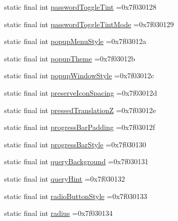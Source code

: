 \begin{DoxyCompactItemize}
\item 
static final int \mbox{\hyperlink{classcom_1_1example_1_1trainawearapplication_1_1_r_1_1attr_ad6f23b93451bdf912f87deeffd37a0a5}{password\+Toggle\+Tint}} =0x7f030128
\item 
static final int \mbox{\hyperlink{classcom_1_1example_1_1trainawearapplication_1_1_r_1_1attr_adf540dc55d652d0bbfb3fc17d3c547c4}{password\+Toggle\+Tint\+Mode}} =0x7f030129
\item 
static final int \mbox{\hyperlink{classcom_1_1example_1_1trainawearapplication_1_1_r_1_1attr_a1cb796186bef2027d1d1a138455631c4}{popup\+Menu\+Style}} =0x7f03012a
\item 
static final int \mbox{\hyperlink{classcom_1_1example_1_1trainawearapplication_1_1_r_1_1attr_a60e108fec02e62dc5b3a785f63c8e58f}{popup\+Theme}} =0x7f03012b
\item 
static final int \mbox{\hyperlink{classcom_1_1example_1_1trainawearapplication_1_1_r_1_1attr_af46850c70a836bf4c9948db67a5e13e9}{popup\+Window\+Style}} =0x7f03012c
\item 
static final int \mbox{\hyperlink{classcom_1_1example_1_1trainawearapplication_1_1_r_1_1attr_aad6bae323d98d568dd9350c79ef4dc6a}{preserve\+Icon\+Spacing}} =0x7f03012d
\item 
static final int \mbox{\hyperlink{classcom_1_1example_1_1trainawearapplication_1_1_r_1_1attr_a79e518da24f5ed865fce2997a4d9fbf3}{pressed\+TranslationZ}} =0x7f03012e
\item 
static final int \mbox{\hyperlink{classcom_1_1example_1_1trainawearapplication_1_1_r_1_1attr_ac7d082a7ed8958addf2d0bafbdcb29cb}{progress\+Bar\+Padding}} =0x7f03012f
\item 
static final int \mbox{\hyperlink{classcom_1_1example_1_1trainawearapplication_1_1_r_1_1attr_a7f579cbe7f76759b6d547b8ffa043ab5}{progress\+Bar\+Style}} =0x7f030130
\item 
static final int \mbox{\hyperlink{classcom_1_1example_1_1trainawearapplication_1_1_r_1_1attr_abb6a1dbf6a0c61447239d8af260dd73f}{query\+Background}} =0x7f030131
\item 
static final int \mbox{\hyperlink{classcom_1_1example_1_1trainawearapplication_1_1_r_1_1attr_adca542daf6438502183c28c6bfa6b73f}{query\+Hint}} =0x7f030132
\item 
static final int \mbox{\hyperlink{classcom_1_1example_1_1trainawearapplication_1_1_r_1_1attr_a8dada23e929aac4868c3483a74a0b2f2}{radio\+Button\+Style}} =0x7f030133
\item 
static final int \mbox{\hyperlink{classcom_1_1example_1_1trainawearapplication_1_1_r_1_1attr_a58db5dad031fefba36b1b4428ef6bbee}{radius}} =0x7f030134

\end{DoxyCompactItemize}
